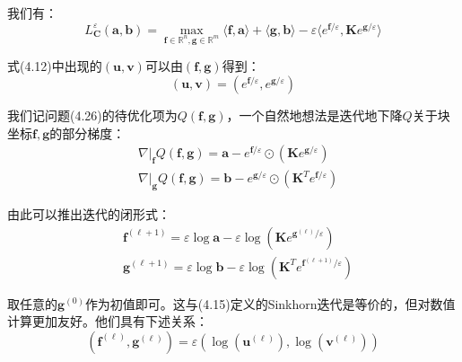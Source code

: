 \documentclass[cn,10pt,math=newtx,citestyle=gb7714-2015,bibstyle=gb7714-2015]{elegantbook}
\begin{document}
\begin{proposition}
我们有：
\begin{equation}
    \label{4.26}
    L_\mathbf{C}^\varepsilon(\mathbf{a,b}) = \max\limits_{\mathbf{f}\in\mathbb{R}^n,\mathbf{g}\in\mathbb{R}^m} \langle \mathbf{f,a} \rangle + \langle \mathbf{g,b} \rangle - \varepsilon \langle e^{\mathbf{f}/\varepsilon},\mathbf{K}e^{\mathbf{g}/\varepsilon} \rangle
\end{equation}

式(4.12)中出现的$(\mathbf{u,v})$可以由$(\mathbf{f,g})$得到：
\begin{equation}
    \label{4.27}
    (\mathbf{u,v}) = ( e^{\mathbf{f}/\varepsilon},e^{\mathbf{g}/\varepsilon} )
\end{equation}
\end{proposition}

\begin{postulate}[块坐标下降法]
我们记问题(4.26)的待优化项为$Q(\mathbf{f,g})$，一个自然地想法是迭代地下降$Q$关于块坐标$\mathbf{f,g}$的部分梯度：
\begin{align}
    \label{4.28}
    & \nabla|_\mathbf{f}Q(\mathbf{f,g}) = \mathbf{a} - e^{\mathbf{f}/\varepsilon} \odot (\mathbf{K} e^{\mathbf{g}/\varepsilon}) \\
    \label{4.29}
    & \nabla|_\mathbf{g}Q(\mathbf{f,g}) = \mathbf{b} - e^{\mathbf{g}/\varepsilon} \odot (\mathbf{K}^T e^{\mathbf{f}/\varepsilon})
\end{align}

由此可以推出迭代的闭形式：
\begin{align}
    \label{4.30}
    & \mathbf{f}^{(\ell+1)} = \varepsilon \log \mathbf{a} - \varepsilon \log \left( \mathbf{K}e^{\mathbf{g}^{(\ell)}/\varepsilon} \right) \\
    \label{4.31}
    & \mathbf{g}^{(\ell+1)} = \varepsilon \log \mathbf{b} - \varepsilon \log \left( \mathbf{K}^T e^{\mathbf{f}^{(\ell+1)}/\varepsilon} \right)
\end{align}

取任意的$\mathbf{g}^{(0)}$作为初值即可。这与(4.15)定义的Sinkhorn迭代是等价的，但对数值计算更加友好。他们具有下述关系：
\begin{equation*}
    (\mathbf{f}^{(\ell)},\mathbf{g}^{(\ell)}) = \varepsilon(\log(\mathbf{u}^{(\ell)}),\log(\mathbf{v}^{(\ell)}))
\end{equation*}
\end{postulate}
\end{document}
